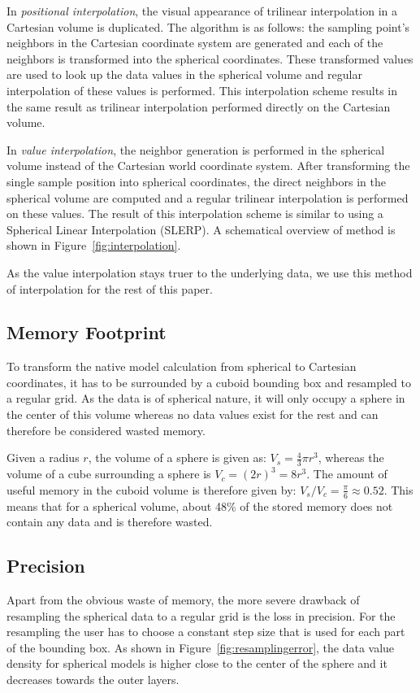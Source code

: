 \documentclass{egpubl}
\begin{document}
In \emph{positional interpolation}, the visual appearance of trilinear interpolation in a  Cartesian volume is duplicated. The algorithm is as follows: the sampling point's neighbors in the Cartesian coordinate system are generated and each of the neighbors is transformed into the spherical coordinates. These transformed values are used to look up the data values in the spherical volume and regular interpolation of these values is performed. This interpolation scheme results in the same result as trilinear interpolation performed directly on the Cartesian volume.

In \emph{value interpolation}, the neighbor generation is performed in the spherical volume instead of the Cartesian world coordinate system. After transforming the single sample position into spherical coordinates, the direct neighbors in the spherical volume are computed and a regular trilinear interpolation is performed on these values. The result of this interpolation scheme is similar to using a Spherical Linear Interpolation (SLERP). A schematical overview of method is shown in Figure~\ref{fig:interpolation}.

As the value interpolation stays truer to the underlying data, we use this method of interpolation for the rest of this paper.

\subsection{Memory Footprint}
\label{sec:memory}
To transform the native model calculation from spherical to Cartesian coordinates, it has to be surrounded by a cuboid bounding box and resampled to a regular grid. As the data is of spherical nature, it will only occupy a sphere in the center of this volume whereas no data values exist for the rest and can therefore be considered wasted memory.

Given a radius $r$, the volume of a sphere is given as: $V_s = \frac{4}{3}\pi r^3$, whereas the volume of a cube surrounding a sphere is $V_c = (2r)^3 = 8r^3$. The amount of useful memory in the cuboid volume is therefore given by: $V_s /V_c = \frac{\pi}{6} \approx 0.52$. This means that for a spherical volume, about 48\% of the stored memory does not contain any data and is therefore wasted.

\subsection{Precision}
\label{sec:precision}
Apart from the obvious waste of memory, the more severe drawback of resampling the spherical data to a regular grid is the loss in precision. For the resampling the user has to choose a constant step size that is used for each part of the bounding box. As shown in Figure~\ref{fig:resamplingerror}, the data value density for spherical models is higher close to the center of the sphere and it decreases towards the outer layers.
\end{document}
